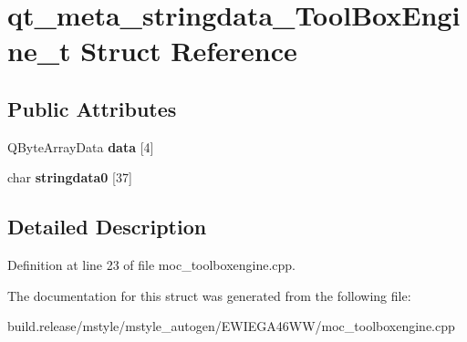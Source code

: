 \hypertarget{structqt__meta__stringdata___tool_box_engine__t}{}\section{qt\+\_\+meta\+\_\+stringdata\+\_\+\+Tool\+Box\+Engine\+\_\+t Struct Reference}
\label{structqt__meta__stringdata___tool_box_engine__t}
\subsection*{Public Attributes}
\begin{DoxyCompactItemize}
\item 
\mbox{\label{structqt__meta__stringdata___tool_box_engine__t_a1a7d4e2dcf6eee693b2a0682a7feec49}} 
Q\+Byte\+Array\+Data {\bfseries data} \mbox{[}4\mbox{]}
\item 
\mbox{\label{structqt__meta__stringdata___tool_box_engine__t_a56950a025c53f1b0e7f0f0c651b3c0b4}} 
char {\bfseries stringdata0} \mbox{[}37\mbox{]}
\end{DoxyCompactItemize}


\subsection{Detailed Description}


Definition at line 23 of file moc\+\_\+toolboxengine.\+cpp.



The documentation for this struct was generated from the following file\+:\begin{DoxyCompactItemize}
\item 
build.\+release/mstyle/mstyle\+\_\+autogen/\+E\+W\+I\+E\+G\+A46\+W\+W/moc\+\_\+toolboxengine.\+cpp\end{DoxyCompactItemize}
